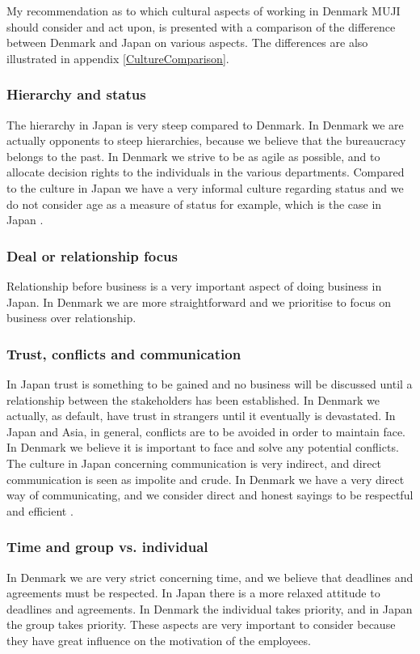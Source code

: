 My recommendation as to which cultural aspects of working in Denmark MUJI should consider and act upon, is presented with a comparison of the difference between Denmark and Japan on various aspects. The differences are also illustrated in appendix \ref{CultureComparison}. 

\subsubsection{Hierarchy and status}
The hierarchy in Japan is very steep compared to Denmark. In Denmark we are actually opponents to steep hierarchies, because we believe that the bureaucracy belongs to the past. In Denmark we strive to be as agile as possible, and to allocate decision rights to the individuals in the various departments. Compared to the culture in Japan we have a very informal culture regarding status
and we do not consider age as a measure of status for example, which is the case in Japan \cite{JapaneseCulture}. 

\subsubsection{Deal or relationship focus}
Relationship before business is a very important aspect of doing business in Japan. In Denmark we are more straightforward and we prioritise to focus on business over relationship.  

\subsubsection{Trust, conflicts and communication}
In Japan trust is something to be gained and no business will be discussed until a relationship between the stakeholders has been established. In Denmark we actually, as default, have trust in strangers until it eventually is devastated. In Japan and Asia, in general, conflicts are to be avoided in order to maintain face. In Denmark we believe it is important to face and solve any potential conflicts. The culture in Japan concerning communication is very indirect, and direct communication is seen as impolite and crude. In Denmark we have a very direct way of communicating, and we consider direct and honest sayings to be respectful and efficient \cite{Communication}.    

\subsubsection{Time and group vs. individual}
In Denmark we are very strict concerning time, and we believe that deadlines and agreements must be respected. In Japan there is a more relaxed attitude to deadlines and agreements. In Denmark the individual takes priority, and in Japan the group takes priority. These aspects are very important to consider because they have great influence on the motivation of the employees. 
